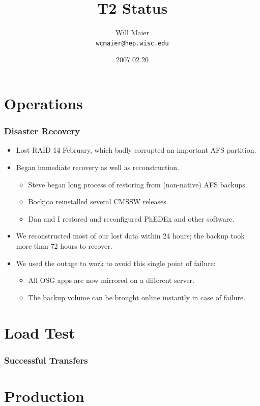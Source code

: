 \documentclass{beamer}
\title{T2 Status}
\author[Will Maier]{Will Maier \\ \texttt{wcmaier@hep.wisc.edu}}
\institute[Wisconsin]{University of Wisconsin - High Energy Physics}
\date{2007.02.20}
\begin{document}



\section{Operations}
\begin{frame}
    \frametitle{Disaster Recovery}
    \begin{itemize}
        \item Lost RAID 14 February, which badly corrupted an important AFS partition.
        \item Began immediate recovery as well as reconstruction.
        \begin{itemize}
            \item Steve began long process of restoring from (non-native) AFS backups.
            \item Bockjoo reinstalled several CMSSW releases.
            \item Dan and I restored and reconfigured PhEDEx and other software.
        \end{itemize}
        \item We reconstructed most of our lost data within 24 hours; the backup took more than 72 hours to recover.
        \item We used the outage to work to avoid this single point of failure:
        \begin{itemize}
            \item All OSG apps are now mirrored on a different server.
            \item The backup volume can be brought online instantly in case of failure.
        \end{itemize}
    \end{itemize}
\end{frame}

\section{Load Test}
\begin{frame}
    \frametitle{Successful Transfers}
\end{frame}

\section{Production}
\begin{frame}
    \frametitle{}
\end{frame}
\end{document}
